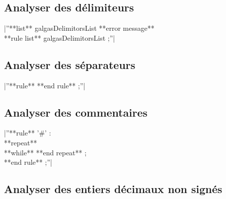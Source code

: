 \subsection{Analyser des délimiteurs}

|''**list** galgasDelimitorsList **error message** %
\\
**rule list** galgasDelimitorsList ;''|

\subsection{Analyser des séparateurs}

|''**rule** %
**end rule** ;''|

\subsection{Analyser des commentaires}

|''**rule** '\#' :\\
 **repeat**\\
 **while** %
 **end repeat** ;\\
**end rule** ;''|

\subsection{Analyser des entiers décimaux non signés}

